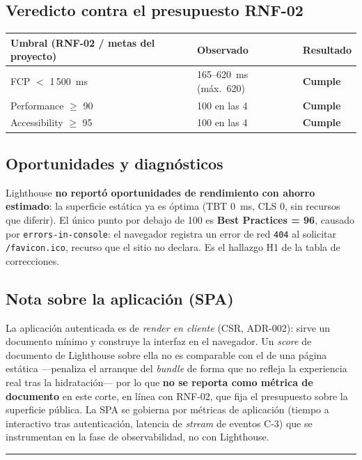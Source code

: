 \documentclass[11pt]{article}
\newcommand{\regla}{\noindent\textcolor{linea}{\rule{\linewidth}{0.4pt}}}
\newcommand{\veredicto}[1]{\textbf{\textcolor{salvia}{#1}}}
\begin{document}
\subsection{Veredicto contra el presupuesto RNF-02}
\noindent
\begin{tabularx}{\linewidth}{@{}l l l@{}}
\toprule
\textbf{Umbral (RNF-02 / metas del proyecto)} & \textbf{Observado} & \textbf{Resultado} \\
\midrule
FCP $<$ 1\,500~ms & 165--620~ms (máx.\ 620) & \veredicto{Cumple} \\
Performance $\ge$ 90 & 100 en las 4 & \veredicto{Cumple} \\
Accessibility $\ge$ 95 & 100 en las 4 & \veredicto{Cumple} \\
\bottomrule
\end{tabularx}

\subsection{Oportunidades y diagnósticos}
Lighthouse \textbf{no reportó oportunidades de rendimiento con ahorro estimado}:
la superficie estática ya es óptima (TBT 0~ms, CLS 0, sin recursos que diferir).
El único punto por debajo de 100 es \textbf{Best Practices = 96}, causado por
\texttt{errors-in-console}: el navegador registra un error de red \texttt{404} al
solicitar \texttt{/favicon.ico}, recurso que el sitio no declara. Es el hallazgo
H1 de la tabla de correcciones.

\subsection{Nota sobre la aplicación (SPA)}
La aplicación autenticada es de \emph{render en cliente} (CSR, ADR-002): sirve un
documento mínimo y construye la interfaz en el navegador. Un \emph{score} de
documento de Lighthouse sobre ella no es comparable con el de una página estática
—penaliza el arranque del \emph{bundle} de forma que no refleja la experiencia
real tras la hidratación— por lo que \textbf{no se reporta como métrica de
documento} en este corte, en línea con RNF-02, que fija el presupuesto sobre la
superficie pública. La SPA se gobierna por métricas de aplicación (tiempo a
interactivo tras autenticación, latencia de \emph{stream} de eventos C-3) que se
instrumentan en la fase de observabilidad, no con Lighthouse.

\regla

\end{document}
